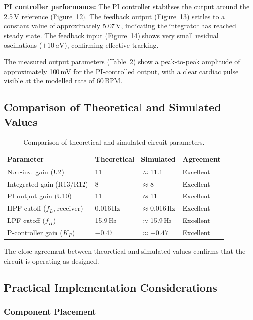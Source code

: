 \documentclass[10pt]{article}
\begin{document}
\textbf{PI controller performance:} The PI controller stabilises the output around the 2.5\,V reference (Figure~12). The feedback output (Figure~13) settles to a constant value of approximately 5.07\,V, indicating the integrator has reached steady state. The feedback input (Figure~14) shows very small residual oscillations ($\pm 10\,\mu$V), confirming effective tracking.

The measured output parameters (Table~2) show a peak-to-peak amplitude of approximately 100\,mV for the PI-controlled output, with a clear cardiac pulse visible at the modelled rate of 60\,BPM.

\subsection{Comparison of Theoretical and Simulated Values}

\begin{table}[H]
\centering
\caption{Comparison of theoretical and simulated circuit parameters.}
\begin{tabular}{llll}
\toprule
Parameter & Theoretical & Simulated & Agreement\\
\midrule
Non-inv. gain (U2) & 11 & $\approx$11.1 & Excellent\\
Integrated gain (R13/R12) & 8 & $\approx$8 & Excellent\\
PI output gain (U10) & 11 & $\approx$11 & Excellent\\
HPF cutoff ($f_L$, receiver) & 0.016\,Hz & $\approx$0.016\,Hz & Excellent\\
LPF cutoff ($f_H$) & 15.9\,Hz & $\approx$15.9\,Hz & Excellent\\
P-controller gain ($K_P$) & $-0.47$ & $\approx-0.47$ & Excellent\\
\bottomrule
\end{tabular}
\end{table}

The close agreement between theoretical and simulated values confirms that the circuit is operating as designed.

\subsection{Practical Implementation Considerations}

\subsubsection{Component Placement}
\end{document}
